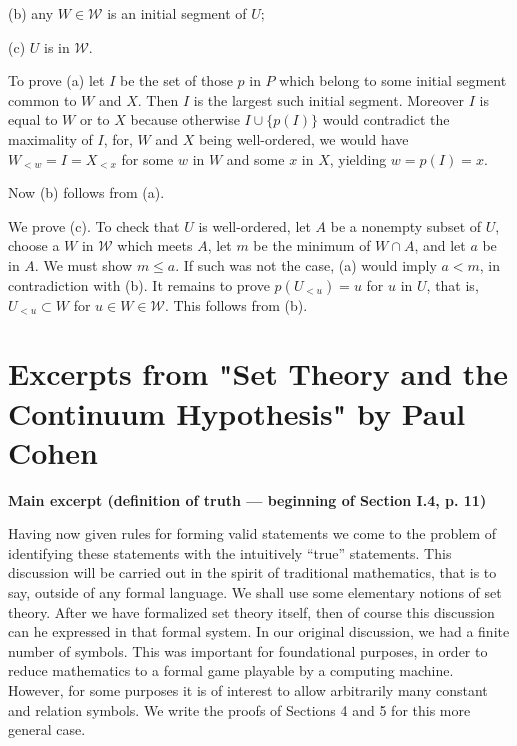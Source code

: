 \documentclass[12pt]{article}
\begin{document}
(b) any $W\in\mathcal W$ is an initial segment of $U$; 

(c) $U$ is in $\mathcal W$.

To prove (a) let $I$ be the set of those $p$ in $P$ which belong to some initial segment common to $W$ and $X$. Then $I$ is the largest such initial segment. Moreover $I$ is equal to $W$ or to $X$ because otherwise $I\cup\{p(I)\}$ would contradict the maximality of $I$, for, $W$ and $X$ being well-ordered, we would have $W_{<w}=I=X_{<x}$ for some $w$ in $W$ and some $x$ in $X$, yielding $w=p(I)=x$. 

Now (b) follows from (a). 

We prove (c). To check that $U$ is well-ordered, let $A$ be a nonempty subset of $U$, choose a $W$ in $\mathcal W$ which meets $A$, let $m$ be the minimum of $W\cap A$, and let $a$ be in $A$. We must show $m\le a$. If such was not the case, (a) would imply $a<m$, in contradiction with (b). It remains to prove $p(U_{<u})=u$ for $u$ in $U$, that is, $U_{<u}\subset W$ for $u\in W\in\mathcal W$. This follows from (b). 

\newpage 

\section{Excerpts from "Set Theory and the Continuum Hypothesis" by Paul Cohen} 

\centerline{\textbf{Main excerpt (definition of truth --- beginning of Section I.4, p. 11)}}

Having now given rules for forming valid statements we come to the problem of identifying these statements with the intuitively ``true'' statements. This discussion will be carried out in the spirit of traditional mathematics, that is to say, outside of any formal language. We shall use some elementary notions of set theory. After we have formalized set theory itself, then of course this discussion can he expressed in that formal system. In our original discussion, we had a finite number of symbols. This was important for foundational purposes, in order to reduce mathematics to a formal game playable by a computing machine. However, for some purposes it is of interest to allow arbitrarily many constant and relation symbols. We write the proofs of Sections 4 and 5 for this more general case.
\end{document}
